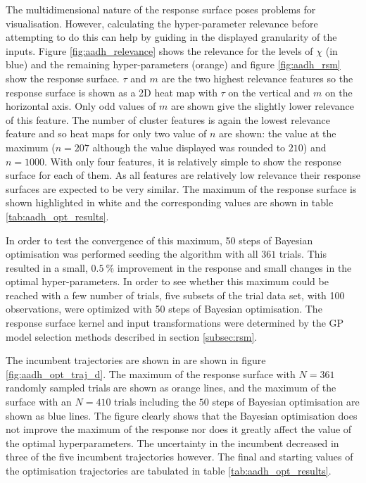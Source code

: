 The multidimensional nature of the response surface poses problems for visualisation. However, calculating the hyper-parameter relevance before attempting to do this can help by guiding in the displayed granularity of the inputs. Figure \ref{fig:aadh_relevance} shows the relevance for the levels of $\chi$ (in blue) and the remaining hyper-parameters (orange) and figure \ref{fig:aadh_rsm} show the response surface. $\tau$ and $m$ are the two highest relevance features so the response surface is shown as a 2D heat map with $\tau$ on the vertical and $m$ on the horizontal axis. Only odd values of $m$ are shown give the slightly lower relevance of this feature. The number of cluster features is again the lowest relevance feature and so heat maps for only two value of $n$ are shown: the value at the maximum ($n=207$ although the value displayed was rounded to $210$) and $n=1000$. With only four features, it is relatively simple to show the response surface for each of them. As all features are relatively low relevance their response surfaces are expected to be very similar. The maximum of the response surface is shown highlighted in white and the corresponding values are shown in table \ref{tab:aadh_opt_results}. 

In order to test the convergence of this maximum, 50 steps of Bayesian optimisation was performed seeding the algorithm with all $361$ trials. This resulted in a small, $\SI{0.5}{\percent}$ improvement in the response and small changes in the optimal hyper-parameters.  In order to see whether this maximum could be reached with a few number of trials, five subsets of the trial data set, with 100 observations, were optimized with 50 steps of Bayesian optimisation. The response surface kernel and input transformations were determined by the GP model selection methods described in section \ref{subsec:rsm}. 

The incumbent trajectories are shown in are shown in figure \ref{fig:aadh_opt_traj_d}. The maximum of the response surface with $N=361$ randomly sampled trials are shown as orange lines, and the maximum of the surface with an $N=410$ trials including the $50$ steps of Bayesian optimisation are shown as blue lines.  The figure clearly shows that the Bayesian optimisation does not improve the maximum of the response nor does it greatly affect the value of the optimal hyperparameters. The uncertainty in the incumbent decreased in three of the five incumbent trajectories however.  The final and starting values of the optimisation trajectories are tabulated in table \ref{tab:aadh_opt_results}. 

